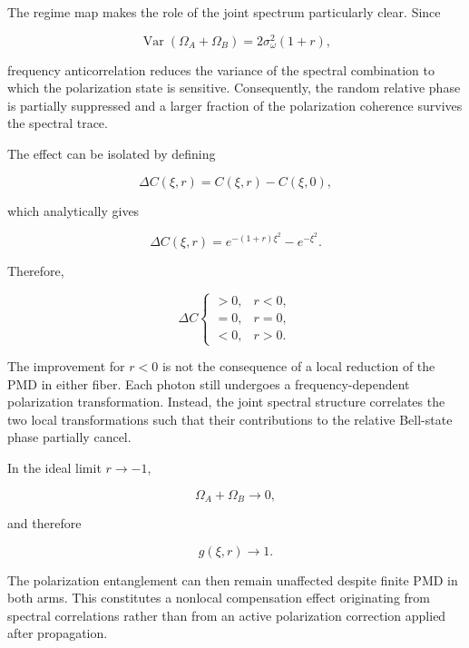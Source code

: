 The regime map makes the role of the joint spectrum particularly clear. Since

\begin{equation}
\operatorname{Var}(\Omega_A+\Omega_B)
=
2\sigma_\omega^2(1+r),
\end{equation}

frequency anticorrelation reduces the variance of the spectral combination to which
the polarization state is sensitive. Consequently, the random relative phase is
partially suppressed and a larger fraction of the polarization coherence survives the
spectral trace.

The effect can be isolated by defining

\begin{equation}
\Delta C(\xi,r)
=
C(\xi,r)-C(\xi,0),
\label{eq:exp2_concurrence_gain}
\end{equation}

which analytically gives

\begin{equation}
\Delta C(\xi,r)
=
e^{-(1+r)\xi^2}
-
e^{-\xi^2}.
\label{eq:exp2_concurrence_gain_analytical}
\end{equation}

Therefore,

\begin{equation}
\Delta C
\begin{cases}
>0, & r<0,
\\
=0, & r=0,
\\
<0, & r>0.
\end{cases}
\end{equation}

The improvement for \(r<0\) is not the consequence of a local reduction of the PMD
in either fiber. Each photon still undergoes a frequency-dependent polarization
transformation. Instead, the joint spectral structure correlates the two local
transformations such that their contributions to the relative Bell-state phase
partially cancel.

In the ideal limit \(r\rightarrow-1\),

\begin{equation}
\Omega_A+\Omega_B\rightarrow0,
\end{equation}

and therefore

\begin{equation}
g(\xi,r)\rightarrow1.
\end{equation}

The polarization entanglement can then remain unaffected despite finite PMD in both
arms. This constitutes a nonlocal compensation effect originating from spectral
correlations rather than from an active polarization correction applied after
propagation.

